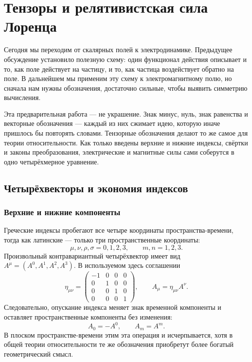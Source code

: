 \chapter{Тензоры и релятивистская сила Лоренца}

Сегодня мы переходим от скалярных полей к электродинамике. Предыдущее обсуждение установило полезную схему: один функционал действия описывает и то, как поле действует на частицу, и то, как частица воздействует обратно на поле. В дальнейшем мы применим эту схему к электромагнитному полю, но сначала нам нужны обозначения, достаточно сильные, чтобы выявить симметрию вычисления.

Эта предварительная работа — не украшение. Знак минус, нуль, знак равенства и векторные обозначения — каждый из них сжимает идею, которую иначе пришлось бы повторять словами. Тензорные обозначения делают то же самое для теории относительности. Как только введены верхние и нижние индексы, свёртки и законы преобразования, электрические и магнитные силы сами соберутся в одно четырёхмерное уравнение.

\section{Четырёхвекторы и экономия индексов}

\subsection{Верхние и нижние компоненты}

Греческие индексы пробегают все четыре координаты пространства-времени, тогда как латинские — только три пространственные координаты:
\begin{equation}
\mu,\nu,\rho,\sigma=0,1,2,3,
\qquad
m,n=1,2,3.
\end{equation}
Произвольный контравариантный четырёхвектор имеет вид \(A^\mu=(A^0,A^1,A^2,A^3)\).
В используемом здесь соглашении
\begin{equation}
\eta_{\mu\nu}
=
\begin{pmatrix}
-1&0&0&0\\
0&1&0&0\\
0&0&1&0\\
0&0&0&1
\end{pmatrix},
\qquad
A_\mu=\eta_{\mu\nu}A^\nu .
\label{eq:sr6-metric-lowering}
\end{equation}
Следовательно, опускание индекса меняет знак временной компоненты и оставляет пространственные компоненты без изменения:
\begin{equation}
A_0=-A^0,
\qquad
A_m=A^m.
\label{eq:sr6-component-lowering}
\end{equation}
В плоском пространстве-времени этим эта операция и исчерпывается, хотя в общей теории относительности те же обозначения приобретут более богатый геометрический смысл.

